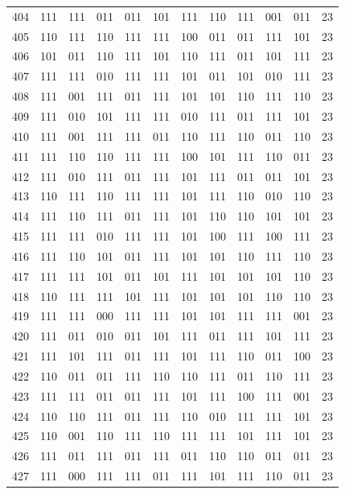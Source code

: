 \begin{longtable}{r*{10}{c}r}
404 & 111 & 111 & 011 & 011 & 101 & 111 & 110 & 111 & 001 & 011 & 23\\
405 & 110 & 111 & 110 & 111 & 111 & 100 & 011 & 011 & 111 & 101 & 23\\
406 & 101 & 011 & 110 & 111 & 101 & 110 & 111 & 011 & 101 & 111 & 23\\
407 & 111 & 111 & 010 & 111 & 111 & 101 & 011 & 101 & 010 & 111 & 23\\
408 & 111 & 001 & 111 & 011 & 111 & 101 & 101 & 110 & 111 & 110 & 23\\
409 & 111 & 010 & 101 & 111 & 111 & 010 & 111 & 011 & 111 & 101 & 23\\
410 & 111 & 001 & 111 & 111 & 011 & 110 & 111 & 110 & 011 & 110 & 23\\
411 & 111 & 110 & 110 & 111 & 111 & 100 & 101 & 111 & 110 & 011 & 23\\
412 & 111 & 010 & 111 & 011 & 111 & 101 & 111 & 011 & 011 & 101 & 23\\
413 & 110 & 111 & 110 & 111 & 111 & 101 & 111 & 110 & 010 & 110 & 23\\
414 & 111 & 110 & 111 & 011 & 111 & 101 & 110 & 110 & 101 & 101 & 23\\
415 & 111 & 111 & 010 & 111 & 111 & 101 & 100 & 111 & 100 & 111 & 23\\
416 & 111 & 110 & 101 & 011 & 111 & 101 & 101 & 110 & 111 & 110 & 23\\
417 & 111 & 111 & 101 & 011 & 101 & 111 & 101 & 101 & 101 & 110 & 23\\
418 & 110 & 111 & 111 & 101 & 111 & 101 & 101 & 101 & 110 & 110 & 23\\
419 & 111 & 111 & 000 & 111 & 111 & 101 & 101 & 111 & 111 & 001 & 23\\
420 & 111 & 011 & 010 & 011 & 101 & 111 & 011 & 111 & 101 & 111 & 23\\
421 & 111 & 101 & 111 & 011 & 111 & 101 & 111 & 110 & 011 & 100 & 23\\
422 & 110 & 011 & 011 & 111 & 110 & 110 & 111 & 011 & 110 & 111 & 23\\
423 & 111 & 111 & 011 & 011 & 111 & 101 & 111 & 100 & 111 & 001 & 23\\
424 & 110 & 110 & 111 & 011 & 111 & 110 & 010 & 111 & 111 & 101 & 23\\
425 & 110 & 001 & 110 & 111 & 110 & 111 & 111 & 101 & 111 & 101 & 23\\
426 & 111 & 011 & 111 & 011 & 111 & 011 & 110 & 110 & 011 & 011 & 23\\
427 & 111 & 000 & 111 & 111 & 011 & 111 & 101 & 111 & 110 & 011 & 23\\

\end{longtable}
